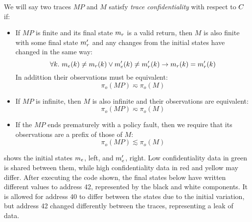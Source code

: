 \documentclass[acmsmall,review,anonymous]{acmart}\settopmatter{printfolios=true,printccs=false,printacmref=false}
\begin{document}
We will say two traces $MP$ and $M$ satisfy {\em trace
  confidentiality} with respect to $C$ if:
\begin{itemize}
\item If $MP$ is finite and its final state $m_r$ is a valid
  return, then $M$ is also finite with some final state $m_r'$ and
  any changes from the initial states have changed in the same way:
$$\forall k. ~ m_e(k) \not = m_r(k)
  \vee m_e'(k) \not = m_r'(k) \rightarrow
  m_r(k) = m_r'(k)$$
  In addittion their observations must be equivalent:
  $$\pi_o(MP) \eqsim \pi_o(M)$$
\item If $MP$ is infinite, then $M$ is also infinite and their
  observations are equivalent:
  $$\pi_o(MP) \eqsim \pi_o(M)$$
\item If the $MP$ ends prematurely with a policy fault, then
  we require that its observations are a prefix of those of $M$:
  $$\pi_o(MP) \lesssim \pi_o(M)$$
\end{itemize}

 shows the initial states \(m_e\), left,
and \(m_e'\), right. Low confidentiality data in green is shared
between them, while high confidentiality data in red and yellow may differ.
After executing the code shown, the final states below have written different
values to address 42, represented by the black and white components.
It is allowed for address 40 to differ between the states due to the initial
variation, but address 42 changed differently between the traces, representing
a leak of data. %
\end{document}
